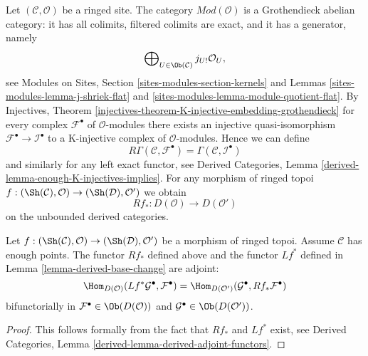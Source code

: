 \noindent
Let $(\mathcal{C}, \mathcal{O})$ be a ringed site.
The category $\textit{Mod}(\mathcal{O})$ is a Grothendieck
abelian category: it has all colimits,
filtered colimits are exact, and it has a generator, namely
$$
\bigoplus\nolimits_{U \in \Ob(\mathcal{C})} j_{U!}\mathcal{O}_U,
$$
see Modules on Sites, Section \ref{sites-modules-section-kernels} and
Lemmas \ref{sites-modules-lemma-j-shriek-flat} and
\ref{sites-modules-lemma-module-quotient-flat}.
By
Injectives, Theorem
\ref{injectives-theorem-K-injective-embedding-grothendieck}
for every complex $\mathcal{F}^\bullet$ of $\mathcal{O}$-modules
there exists an injective quasi-isomorphism
$\mathcal{F}^\bullet \to \mathcal{I}^\bullet$ to a K-injective complex
of $\mathcal{O}$-modules. Hence we can define
$$
R\Gamma(\mathcal{C}, \mathcal{F}^\bullet) =
\Gamma(\mathcal{C}, \mathcal{I}^\bullet)
$$
and similarly for any left exact functor, see
Derived Categories, Lemma \ref{derived-lemma-enough-K-injectives-implies}.
For any morphism of
ringed topoi
$f : (\Sh(\mathcal{C}), \mathcal{O}) \to (\Sh(\mathcal{D}), \mathcal{O}')$
we obtain
$$
Rf_* : D(\mathcal{O}) \longrightarrow D(\mathcal{O}')
$$
on the unbounded derived categories.

\begin{lemma}
\label{lemma-adjoint}
Let $f : (\Sh(\mathcal{C}), \mathcal{O}) \to (\Sh(\mathcal{D}), \mathcal{O}')$
be a morphism of ringed topoi. Assume $\mathcal{C}$ has enough points.
The functor $Rf_*$ defined above and
the functor $Lf^*$ defined in
Lemma \ref{lemma-derived-base-change} are adjoint:
$$
\Hom_{D(\mathcal{O})}(Lf^*\mathcal{G}^\bullet, \mathcal{F}^\bullet)
=
\Hom_{D(\mathcal{O}')}(\mathcal{G}^\bullet, Rf_*\mathcal{F}^\bullet)
$$
bifunctorially in $\mathcal{F}^\bullet \in \Ob(D(\mathcal{O}))$ and
$\mathcal{G}^\bullet \in \Ob(D(\mathcal{O}'))$.
\end{lemma}

\begin{proof}
This follows formally from the fact that $Rf_*$ and $Lf^*$ exist, see
Derived Categories, Lemma \ref{derived-lemma-derived-adjoint-functors}.
\end{proof}

